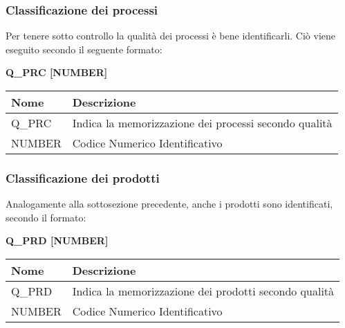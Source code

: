 \subsubsection{Classificazione dei processi}
Per tenere sotto controllo la qualità dei processi è bene identificarli. 
Ciò viene eseguito secondo il seguente formato:
\begin{center}
    \textbf{Q\_PRC [NUMBER]}
\end{center} 
\renewcommand{\arraystretch}{1.8} %
    \begin{tabular}{ |m{7em}|m{30em}| }
        \hline
        \textbf{Nome} & \textbf{Descrizione} \\
        \hline
            Q\_PRC & Indica la memorizzazione dei processi secondo qualità \\
        \hline
            NUMBER & Codice Numerico Identificativo \\
        \hline
    \end{tabular}
\subsubsection{Classificazione dei prodotti}
Analogamente alla sottosezione precedente, anche i prodotti sono identificati, secondo il formato:
\begin{center}
    \textbf{Q\_PRD [NUMBER]}
\end{center}
\renewcommand{\arraystretch}{1.8} %
    \begin{tabular}{ |m{7em}|m{30em}| }
        \hline
        \textbf{Nome} & \textbf{Descrizione} \\
        \hline
            Q\_PRD & Indica la memorizzazione dei prodotti secondo qualità \\
        \hline
            NUMBER & Codice Numerico Identificativo \\
        \hline
    \end{tabular}